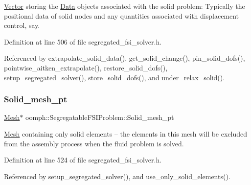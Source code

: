 \hyperlink{classoomph_1_1Vector}{Vector} storing the \hyperlink{classoomph_1_1Data}{Data} objects associated with the solid problem\+: Typically the positional data of solid nodes and any quantities associated with displacement control, say. 



Definition at line 506 of file segregated\+\_\+fsi\+\_\+solver.\+h.



Referenced by extrapolate\+\_\+solid\+\_\+data(), get\+\_\+solid\+\_\+change(), pin\+\_\+solid\+\_\+dofs(), pointwise\+\_\+aitken\+\_\+extrapolate(), restore\+\_\+solid\+\_\+dofs(), setup\+\_\+segregated\+\_\+solver(), store\+\_\+solid\+\_\+dofs(), and under\+\_\+relax\+\_\+solid().

\mbox{\label{classoomph_1_1SegregatableFSIProblem_a3e7f6f5452767279d21ccbfc6336ef12}} 
\subsubsection{\texorpdfstring{Solid\+\_\+mesh\+\_\+pt}{Solid\_mesh\_pt}}
{\footnotesize\ttfamily \hyperlink{classoomph_1_1Mesh}{Mesh}$\ast$ oomph\+::\+Segregatable\+F\+S\+I\+Problem\+::\+Solid\+\_\+mesh\+\_\+pt\hspace{0.3cm}{\ttfamily [protected]}}



\hyperlink{classoomph_1_1Mesh}{Mesh} containing only solid elements -- the elements in this mesh will be excluded from the assembly process when the fluid problem is solved. 



Definition at line 524 of file segregated\+\_\+fsi\+\_\+solver.\+h.



Referenced by setup\+\_\+segregated\+\_\+solver(), and use\+\_\+only\+\_\+solid\+\_\+elements().

\mbox{\label{classoomph_1_1SegregatableFSIProblem_a0f5d6ec62fd33f83600b69c9fcb1f4ed}} 
